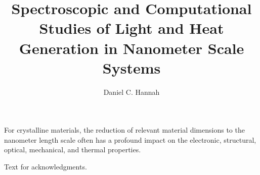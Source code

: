 \documentclass[12pt]{nuthesis}	%
\author{Daniel C. Hannah}
\title{Spectroscopic and Computational Studies of Light and Heat Generation in Nanometer Scale Systems}
\begin{document}
%	
%


\frontmatter		%

\maketitle		%

\copyrightpage		%


\abstract		%

For crystalline materials, the reduction of relevant material dimensions to the nanometer length scale often has a profound impact on the electronic, structural, optical, mechanical, and thermal properties.  

\acknowledgements	%

Text for acknowledgments.





%
%
%
%
%
%
%
\dedication{\emph{To my parents, who taught me the importance of loving what I do.}}
%

\clearpage{} %
\tableofcontents	%

\clearpage{} %
\listoftables		%

\clearpage{} %
\listoffigures		%



\mainmatter             %


\end{document}
